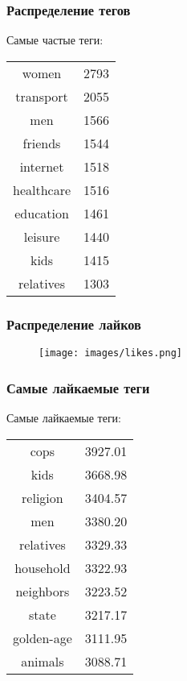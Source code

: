 \documentclass[14pt]{beamer}
\begin{document}
\begin{frame}[fragile]
	
	\frametitle{Распределение тегов}
	
	\begin{center}
		Самые частые теги:
		
		\begin{tabular}{c|c}
			women & 2793 \\
			transport & 2055 \\
			men & 1566 \\
			friends & 1544 \\
			internet & 1518 \\
			healthcare & 1516 \\
			education & 1461 \\
			leisure & 1440 \\
			kids & 1415 \\
			relatives & 1303 \\
		\end{tabular}
	\end{center}
	
\end{frame}

\begin{frame}[fragile]
	
	\frametitle{Распределение лайков}
	
	\begin{figure}
		\texttt{[image: images/likes.png]}
	\end{figure}
	
\end{frame}


\begin{frame}[fragile]
	
	\frametitle{Самые лайкаемые теги}
	
	\begin{center}
		Самые лайкаемые теги:
		
		\begin{tabular}{c|c}
			cops & 3927.01 \\
			kids & 3668.98 \\
			religion & 3404.57 \\
			men & 3380.20 \\
			relatives & 3329.33 \\
			household & 3322.93 \\
			neighbors & 3223.52 \\
			state & 3217.17 \\
			golden-age & 3111.95 \\
			animals & 3088.71 \\
		\end{tabular}
	\end{center}
	
\end{frame}
\end{document}
